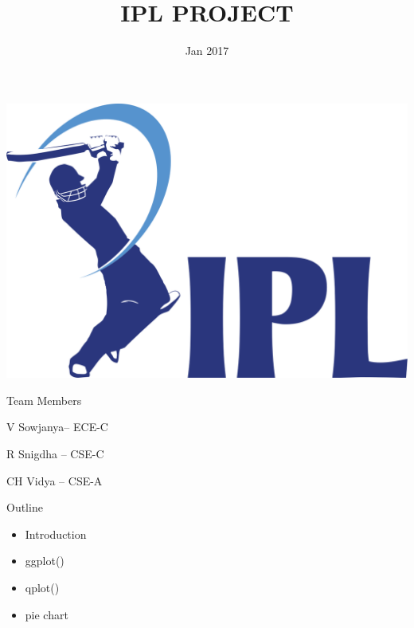 \documentclass[14pt]{beamer}
\title[IPL]{IPL PROJECT}
\institute[L\&D]{Shri Vishnu Engineering College for Women
                        (Autonomous)}
\date{Jan 2017}
\begin{document}
\begin{frame}
  \titlepage
\end{frame}
\begin{frame}
  \begin{center}
    \includegraphics[scale=0.1]{ipl.png}
  \end{center}
\end{frame}

\begin{frame}{Team Members}
\center

V Sowjanya-- ECE-C\center

R Snigdha -- CSE-C\center

CH Vidya -- CSE-A\end{frame}

\begin{frame}{Outline}
\begin{itemize}
    \item Introduction
    \item ggplot()
    \item qplot()
    \item pie chart
\end{itemize}
\end{frame}
\end{document}
